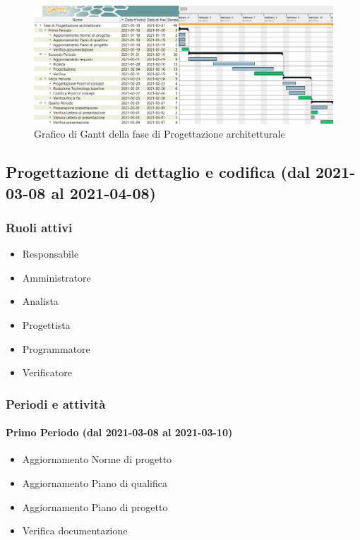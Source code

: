 \begin{landscape}
	\begin{figure}[H]
		\centering
		\includegraphics[width=\linewidth]{res/images/ganttFase2.png}
		\caption{Grafico di Gantt della fase di Progettazione architetturale}
		\label{fig:Gantt Analisi dei requisiti}
	\end{figure}
\end{landscape}

\subsection{Progettazione di dettaglio e codifica (dal 2021-03-08 al 2021-04-08)}

\subsubsection{Ruoli attivi}
\begin{itemize}
	\item Responsabile
	\item Amministratore
	\item Analista
	\item Progettista
	\item Programmatore
	\item Verificatore
\end{itemize}

\subsubsection{Periodi e attività}

\paragraph{Primo Periodo (dal 2021-03-08 al 2021-03-10)}
\begin{itemize}
	\item Aggiornamento Norme di progetto
	\item Aggiornamento Piano di qualifica
	\item Aggiornamento Piano di progetto
	\item Verifica documentazione
\end{itemize}

